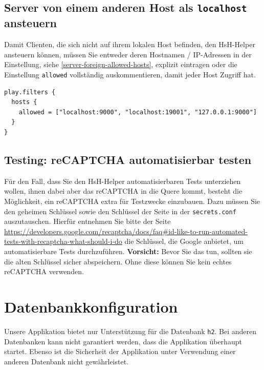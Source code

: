 \documentclass[12pt,DIV14,BCOR10mm,a4paper,parskip=half-,headsepline,headinclude,english,ngerman,bibliography=totocnumbered]{scrreprt}
\begin{document}
\subsection{Server von einem anderen Host als \texttt{localhost} ansteuern}
\label{server-subsubsection-different-host}

Damit Clienten, die sich nicht auf ihrem lokalen Host befinden, den HsH-Helper ansteuern können, müssen Sie entweder deren Hostnamen / IP-Adressen in der Einstellung, siehe \autoref{server-foreign-allowed-hosts}, explizit eintragen oder die Einstellung \texttt{allowed} vollständig auskommentieren, damit jeder Host Zugriff hat.

\begin{lstlisting}[label=server-foreign-allowed-hosts, caption={"Erlaubte Hosts"-Einstellung innerhalb der Konfigurationsdatei},captionpos=b]
play.filters {
  hosts {
    allowed = ["localhost:9000", "localhost:19001", "127.0.0.1:9000"]
  }
}
\end{lstlisting}

\subsection{Testing: reCAPTCHA automatisierbar testen}

Für den Fall, dass Sie den HsH-Helper automatisierbaren Tests unterziehen wollen, ihnen dabei aber das reCAPTCHA in die Quere kommt, besteht die Möglichkeit, ein reCAPTCHA extra für Testzwecke einzubauen.
Dazu müssen Sie den geheimen Schlüssel sowie den Schlüssel der Seite in der \texttt{secrets.conf} auszutauschen.
Hierfür entnehmen Sie bitte der Seite \url{https://developers.google.com/recaptcha/docs/faq\#id-like-to-run-automated-tests-with-recaptcha-what-should-i-do} die Schlüssel, die Google anbietet, um automatisierbare Tests durchzuführen.
\textbf{Vorsicht:} Bevor Sie das tun, sollten sie die alten Schlüssel sicher abspeichern.
Ohne diese können Sie kein echtes reCAPTCHA verwenden.

\section{Datenbankkonfiguration}

Unsere Applikation bietet nur Unterstützung für die Datenbank \texttt{h2}.
Bei anderen Datenbanken kann nicht garantiert werden, dass die Applikation überhaupt startet.
Ebenso ist die Sicherheit der Applikation unter Verwendung einer anderen Datenbank nicht gewährleistet.
\end{document}

